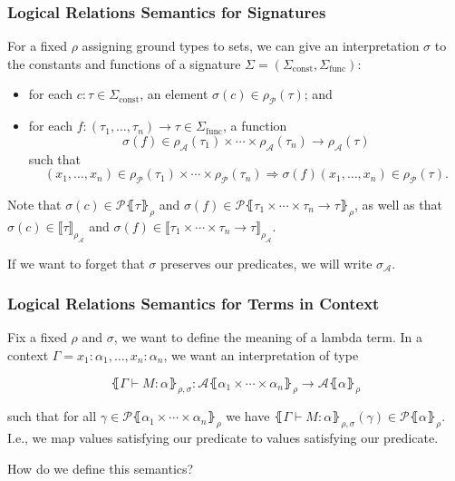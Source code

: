 \documentclass[aspectratio=169]{beamer}
\begin{document}
\begin{frame}
\frametitle{Logical Relations Semantics for Signatures}

For a fixed $\rho$ assigning ground types to sets, we can give an interpretation $\sigma$  to the constants and functions of a signature $\Sigma = (\Sigma_{\text{const}}, \Sigma_{\text{func}})$:
\begin{itemize}
    \item for each $c : \tau \in \Sigma_{\text{const}}$, an element $\sigma(c) \in \rho_{\mathcal{P}}(\tau)$; and
    \item for each $f : (\tau_1, \ldots, \tau_n) \to \tau \in \Sigma_{\text{func}}$, a function
    \[\sigma(f) \in \rho_{\mathcal{A}}(\tau_1) \times \cdots \times \rho_{\mathcal{A}}(\tau_n) \to \rho_{\mathcal{A}}(\tau)\]
    such that
    \[(x_1, \ldots, x_n) \in \rho_{\mathcal{P}}(\tau_1) \times \cdots \times \rho_{\mathcal{P}}(\tau_n) \Rightarrow \sigma(f)(x_1, \ldots, x_n) \in \rho_{\mathcal{P}}(\tau).\]
\end{itemize}

\medskip

Note that $\sigma(c) \in \mathcal{P}\lBrace \tau \rBrace_{\rho}$ and $\sigma(f) \in \mathcal{P}\lBrace \tau_1 \times \cdots \times \tau_n \rightarrow \tau \rBrace_{\rho}$, as well as that $\sigma(c) \in \llbracket \tau \rrbracket_{\rho_{\mathcal{A}}}$ and $\sigma(f) \in \llbracket \tau_1 \times \cdots \times \tau_n \rightarrow \tau \rrbracket_{\rho_{\mathcal{A}}}$.

\medskip

If we want to forget that $\sigma$ preserves our predicates, we will write $\sigma_{\mathcal{A}}$.

\end{frame}

\begin{frame}
\frametitle{Logical Relations Semantics for Terms in Context}

Fix a fixed $\rho$ and $\sigma$, we want to define the meaning of a lambda term.
In a context $\Gamma = x_1 : \alpha_1, \ldots, x_n : \alpha_n$, we want an interpretation of type

\[
\lBrace \Gamma \vdash M : \alpha \rBrace_{\rho, \sigma} : \mathcal{A}\lBrace \alpha_1 \times \cdots \times \alpha_n \rBrace_\rho \to \mathcal{A}\lBrace \alpha \rBrace_\rho
\]

such that for all $\gamma \in \mathcal{P}\lBrace \alpha_1 \times \cdots \times \alpha_n \rBrace_\rho$ we have $\lBrace \Gamma \vdash M : \alpha \rBrace_{\rho, \sigma}(\gamma) \in \mathcal{P}\lBrace \alpha \rBrace_\rho$.
I.e., we map values satisfying our predicate to values satisfying our predicate.

\medskip

How do we define this semantics?

\end{frame}
\end{document}
